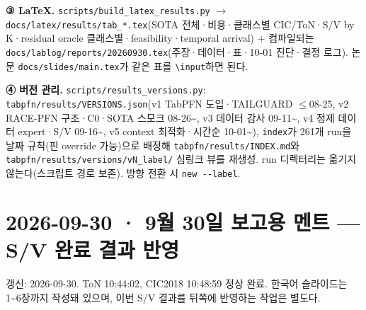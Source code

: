 \textbf{③ LaTeX.} \texttt{scripts/\allowbreak{}\allowbreak{}build\_\allowbreak{}\allowbreak{}la\allowbreak{}tex\_\allowbreak{}\allowbreak{}resu\allowbreak{}lts.\allowbreak{}py}  \ensuremath{\rightarrow}  \texttt{docs/\allowbreak{}\allowbreak{}lat\allowbreak{}ex/\allowbreak{}\allowbreak{}resul\allowbreak{}ts/\allowbreak{}\allowbreak{}tab\_\allowbreak{}\allowbreak{}*\allowbreak{}.\allowbreak{}tex}(SOTA 전체·비용·클래스별 CIC/\allowbreak{}ToN·S/\allowbreak{}V by K·residual oracle 클래스별·feasibility·temporal arrival) +\allowbreak{} 컴파일되는 \texttt{docs/\allowbreak{}\allowbreak{}lab\allowbreak{}log/\allowbreak{}\allowbreak{}repo\allowbreak{}rts/\allowbreak{}\allowbreak{}2026\allowbreak{}0930.\allowbreak{}tex\allowbreak{}}(주장·데이터·표·10-01 진단·결정 로그). 논문 \texttt{docs/\allowbreak{}\allowbreak{}sli\allowbreak{}des/\allowbreak{}\allowbreak{}main\allowbreak{}.\allowbreak{}tex}가 같은 표를 \texttt{\textbackslash{}input}하면 된다.

\textbf{④ 버전 관리.} \texttt{scripts/\allowbreak{}\allowbreak{}results\_\allowbreak{}\allowbreak{}versions\allowbreak{}.\allowbreak{}py}: \texttt{tabpfn/\allowbreak{}\allowbreak{}r\allowbreak{}esults/\allowbreak{}\allowbreak{}V\allowbreak{}ERSIONS.\allowbreak{}json}(v1 TabPFN 도입·TAILGUARD \ensuremath{\leq}08-25, v2 RACE-PFN 구조·C0·SOTA 스모크 08-26\textasciitilde{}, v3 데이터 감사 09-11\textasciitilde{}, v4 정제 데이터 expert·S/\allowbreak{}V 09-16\textasciitilde{}, v5 context 최적화·시간순 10-01\textasciitilde{}), \texttt{index}가 261개 run을 날짜 규칙(핀 override 가능)으로 배정해 \texttt{tabpfn/\allowbreak{}\allowbreak{}r\allowbreak{}esults/\allowbreak{}\allowbreak{}I\allowbreak{}NDEX.\allowbreak{}md}와 \texttt{tabpfn/\allowbreak{}\allowbreak{}r\allowbreak{}esults/\allowbreak{}\allowbreak{}v\allowbreak{}ersions/\allowbreak{}\allowbreak{}vN\_\allowbreak{}\allowbreak{}label\allowbreak{}/\allowbreak{}\allowbreak{}} 심링크 뷰를 재생성. run 디렉터리는 옮기지 않는다(스크립트 경로 보존). 방향 전환 시 \texttt{new -\allowbreak{}-\allowbreak{}la\allowbreak{}bel}.



\section{2026-09-30 · 9월 30일 보고용 멘트 — S/\allowbreak{}V 완료 결과 반영}
\label{report:20260930_exp62_briefing_ko}
갱신: 2026-09-30. ToN 10:44:02, CIC2018 10:48:59 정상 완료. 한국어 슬라이드는 1\textasciitilde{}6장까지 작성돼 있으며, 이번 S/\allowbreak{}V 결과를 뒤쪽에 반영하는 작업은 별도다.

